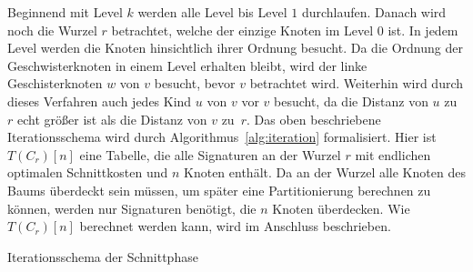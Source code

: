 Beginnend mit Level $k$ werden alle Level bis Level $1$ durchlaufen.
Danach wird noch die Wurzel $r$ betrachtet, welche der einzige Knoten im Level $0$ ist. 
In jedem Level werden die Knoten hinsichtlich ihrer Ordnung besucht.
Da die Ordnung der Geschwisterknoten in einem Level erhalten bleibt, wird der linke Geschisterknoten $w$ von $v$ besucht, bevor $v$ betrachtet wird.
Weiterhin wird durch dieses Verfahren auch jedes Kind $u$ von $v$ vor $v$ besucht, da die Distanz von $u$ zu~$r$ echt größer ist als die Distanz von $v$ zu~$r$.
Das oben beschriebene Iterationsschema wird durch Algorithmus~\ref{alg:iteration} formalisiert.
Hier ist $T(C_r)[n]$ eine Tabelle, die alle Signaturen an der Wurzel $r$ mit endlichen optimalen Schnittkosten und $n$ Knoten enthält.
Da an der Wurzel alle Knoten des Baums überdeckt sein müssen, um später eine Partitionierung berechnen zu können, werden nur Signaturen benötigt, die $n$ Knoten überdecken.
Wie $T(C_r)[n]$ berechnet werden kann, wird im Anschluss beschrieben.

\begin{algorithm}
    \caption{Iterationsschema der Schnittphase}\label{alg:iteration}
    \begin{algorithmic}[1]
             
                 
                    \State {}
                \EndFor
            \EndFor
             
                \State {}
            \EndFor
             
        \EndFunction
    \end{algorithmic}
\end{algorithm}

\newcommand{\canfun}{\textproc{cut\_at\_node}}
\newcommand{\carfun}{\textproc{cut\_at\_root}}

